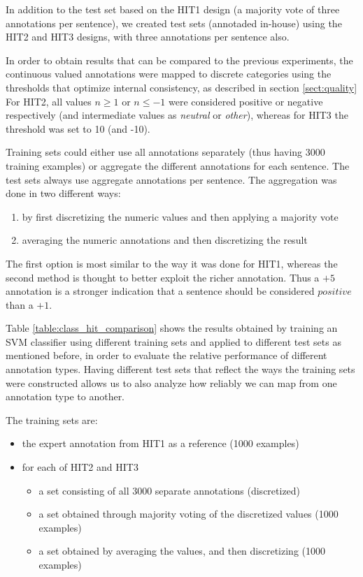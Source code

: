 \documentclass[11pt, a4paper,onecolumn]{article}
\begin{document}
In addition to the test set based on the HIT1 design (a majority vote of three annotations per sentence), we created test sets (annotaded in-house) using the HIT2 and HIT3 designs, with three annotations per sentence also.

In order to obtain results that can be compared to the previous experiments, the continuous valued annotations were mapped to discrete categories using the thresholds that optimize internal consistency, as described in section \ref{sect:quality}  For HIT2, all values $n \geq 1$ or $n \leq -1$ were considered positive or negative respectively (and intermediate values as \emph{neutral} or \emph{other}), whereas for HIT3 the threshold was set to 10 (and -10).

Training sets could either use all annotations separately (thus having 3000 training examples) or aggregate the different annotations for each sentence.  The test sets always use aggregate annotations per sentence.  The aggregation was done in two different ways:
\begin{enumerate}
 \item by first discretizing the numeric values and then applying a majority vote
 \item averaging the numeric annotations and then discretizing the result
\end{enumerate}

The first option is most similar to the way it was done for HIT1, whereas the second method is thought to better exploit the richer annotation.  Thus a $+5$ annotation is a stronger indication that a sentence should be considered $positive$ than a $+1$.

Table \ref{table:class_hit_comparison} shows the results obtained by training an SVM classifier using different training sets and applied to different test sets as mentioned before, in order to evaluate the relative performance of different annotation types.  Having different test sets that reflect the ways the training sets were constructed allows us to also analyze how reliably we can map from one annotation type to another.

The training sets are:
\begin{itemize}
 \item the expert annotation from HIT1 as a reference (1000 examples)
 \item for each of HIT2 and HIT3
 \begin{itemize}
  \item a set consisting of all 3000 separate annotations (discretized)
  \item a set obtained through majority voting of the discretized values (1000 examples)
  \item a set obtained by averaging the values, and then discretizing (1000 examples)
 \end{itemize}
\end{itemize}
\end{document}
